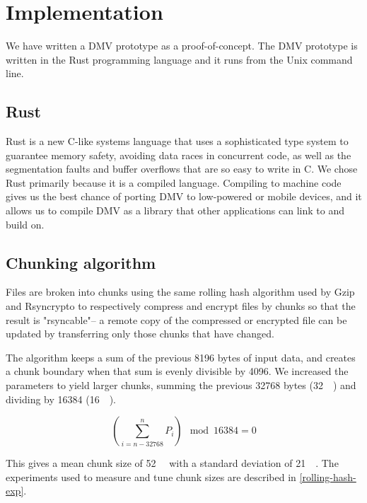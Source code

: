 \chapter{Implementation}

We have written a DMV prototype as a proof-of-concept. The DMV prototype is
written in the Rust programming language and it runs from the Unix command line.


\section{Rust}

Rust is a new C-like systems language that uses a sophisticated type system to
guarantee memory safety, avoiding data races in concurrent code, as well as the
segmentation faults and buffer overflows that are so easy to write in C. We
chose Rust primarily because it is a compiled language. Compiling to machine
code gives us the best chance of porting DMV to low-powered or mobile devices,
and it allows us to compile DMV as a library that other applications can link to
and build on.



\section{Chunking algorithm}

Files are broken into chunks using the same rolling hash algorithm used by Gzip
and Rsyncrypto\cite{rsyncrypto_algorithm} to respectively compress and encrypt
files by chunks so that the result is "rsyncable"-- a remote copy of the
compressed or encrypted file can be updated by transferring only those chunks
that have changed.

The algorithm keeps a sum of the previous \num{8196} bytes of input data, and
creates a chunk boundary when that sum is evenly divisible by \num{4096}. We
increased the parameters to yield larger chunks, summing the previous
\num{32768} bytes (\SI{32}{\kibi\byte}) and dividing by \num{16384}
(\SI{16}{\kibi\relax}).

\begin{equation*}
    \left( \sum_{i = n - \num{32768} }^{n}{P_i} \right) \mod \num{16384} = 0
\end{equation*}

This gives a mean chunk size of \SI{52}{\kibi\byte} with a standard deviation of
\SI{21}{\kibi\byte}. The experiments used to measure and tune chunk sizes are
described in \autoref{rolling-hash-exp}.





